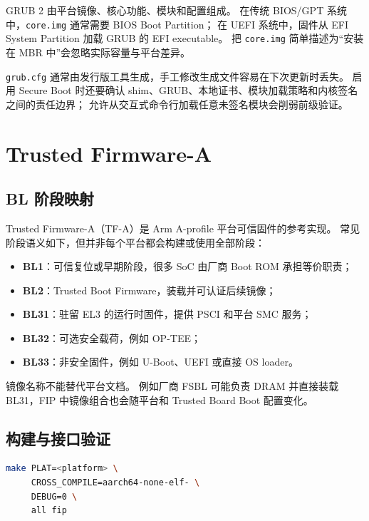 GRUB 2 由平台镜像、核心功能、模块和配置组成\cite{grub-manual}。
在传统 BIOS/GPT 系统中，\texttt{core.img} 通常需要 BIOS Boot Partition；
在 UEFI 系统中，固件从 EFI System Partition 加载 GRUB 的 EFI executable。
把 \texttt{core.img} 简单描述为“安装在 MBR 中”会忽略实际容量与平台差异。

\texttt{grub.cfg} 通常由发行版工具生成，手工修改生成文件容易在下次更新时丢失。
启用 Secure Boot 时还要确认 shim、GRUB、本地证书、模块加载策略和内核签名之间的责任边界；
允许从交互式命令行加载任意未签名模块会削弱前级验证。

\section{Trusted Firmware-A}

\subsection{BL 阶段映射}

Trusted Firmware-A（TF-A）是 Arm A-profile 平台可信固件的参考实现\cite{trusted-firmware-a-doc}。
常见阶段语义如下，但并非每个平台都会构建或使用全部阶段：

\begin{itemize}
  \item \textbf{BL1}：可信复位或早期阶段，很多 SoC 由厂商 Boot ROM 承担等价职责；
  \item \textbf{BL2}：Trusted Boot Firmware，装载并可认证后续镜像；
  \item \textbf{BL31}：驻留 EL3 的运行时固件，提供 PSCI 和平台 SMC 服务；
  \item \textbf{BL32}：可选安全载荷，例如 OP-TEE；
  \item \textbf{BL33}：非安全固件，例如 U-Boot、UEFI 或直接 OS loader。
\end{itemize}

镜像名称不能替代平台文档。
例如厂商 FSBL 可能负责 DRAM 并直接装载 BL31，FIP 中镜像组合也会随平台和 Trusted Board Boot 配置变化。

\subsection{构建与接口验证}

\begin{lstlisting}[language=bash,caption={TF-A 平台构建形式示意}]
make PLAT=<platform> \
     CROSS_COMPILE=aarch64-none-elf- \
     DEBUG=0 \
     all fip
\end{lstlisting}

